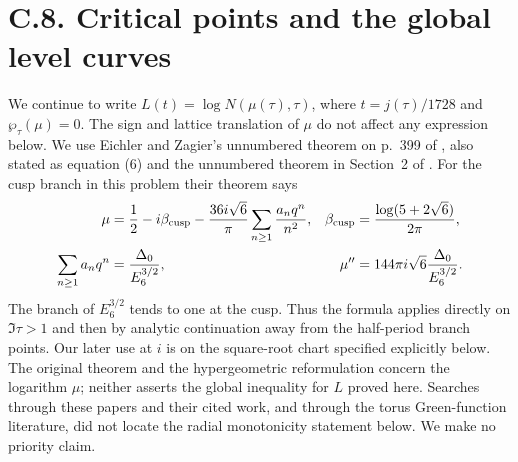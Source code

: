 \section{C.8. Critical points and the global level curves}

We continue to write $L(t)=\log N(\mu(\tau),\tau)$, where
$t=j(\tau)/1728$ and $\wp_\tau(\mu)=0$. The sign and lattice
translation of $\mu$ do not affect any expression below. We use
Eichler and Zagier's unnumbered theorem on p.~399 of
\cite{EichlerZagier1982}, also stated as equation (6) and the
unnumbered theorem in Section~2 of \cite{DukeImamoglu2008}.
For the cusp branch in this problem their theorem says
\begin{equation}\label{ari:eq:cc-EZ}
 \begin{aligned}
 \mu&=\frac12-i\beta_{\rm cusp}-
       \frac{36i\sqrt6}{\pi}\sum_{n\ge1}\frac{a_nq^n}{n^2},
 &\beta_{\rm cusp}&=\frac{\log(5+2\sqrt6)}{2\pi},\\
 \sum_{n\ge1}a_nq^n&=\frac{\Delta_0}{E_6^{3/2}},
 &\mu''&=144\pi i\sqrt6\frac{\Delta_0}{E_6^{3/2}}.
 \end{aligned}
\end{equation}
The branch of $E_6^{3/2}$ tends to one at the cusp. Thus the
formula applies directly on $\Im\tau>1$ and then by analytic
continuation away from the half-period branch points. Our later
use at $i$ is on the square-root chart specified explicitly below.
The original theorem and the hypergeometric reformulation concern
the logarithm $\mu$; neither asserts the global inequality for
$L$ proved here. Searches through these papers and their cited
work, and through the torus Green-function literature, did not
locate the radial monotonicity statement below. We make no
priority claim.

